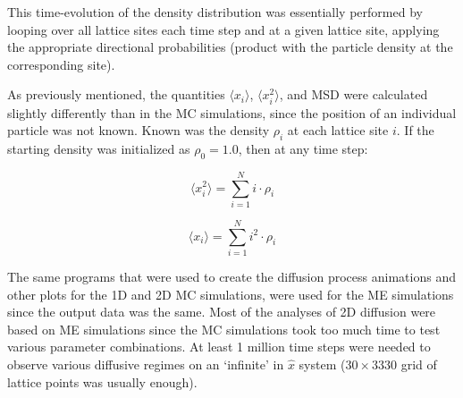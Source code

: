 	This time-evolution of the density distribution was essentially performed by looping over all lattice sites each time step and at a given lattice site, applying the appropriate directional probabilities (product with the particle density at the corresponding site). 
	
	
	As previously mentioned, the quantities $ \langle x_{i} \rangle $, $ \langle x_{i}^2 \rangle $, and MSD were calculated slightly differently than in the MC simulations, since the position of an individual particle was not known. Known was the density $ \rho_i $ at each lattice site  $ i $. If the starting density was initialized as $ \rho_0 = 1.0 $, then at any time step:
	
	\begin{equation}
		\langle x_{i}^2 \rangle = \sum_{i=1}^{N} i \cdot \rho_i 
	\end{equation}
	
	\begin{equation}
		\langle x_{i} \rangle = \sum_{i=1}^{N} i^2\cdot \rho_i
	\end{equation}
	
	The same programs that were used to create the diffusion process animations and other plots for the 1D and 2D MC simulations, were used for the ME simulations since the output data was the same. Most of the analyses of 2D diffusion were based on ME simulations since the MC simulations took too much time to test various parameter combinations. At least 1 million time steps were needed to observe various diffusive regimes on an `infinite' in $ \hat{x} $ system ($ 30 \times 3330$ grid of lattice points was usually enough).
	
	
